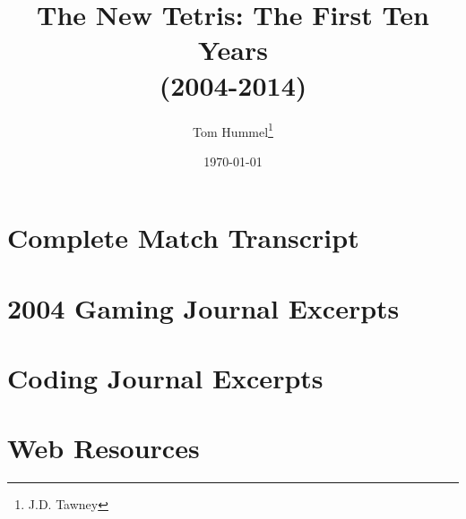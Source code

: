 \documentclass[a4paper,twoside,titlepage]{book}
\title{The New Tetris: The First Ten Years 
\\(2004-2014)}
\author{Tom Hummel\thanks{J.D. Tawney}}
\date{\today}
\begin{document}
  \maketitle
  \tableofcontents \newpage
  
  
  
  
  
  
  
  \begin{appendices}
    \chapter{Complete Match Transcript}
    \chapter{2004 Gaming Journal Excerpts}
    \chapter{Coding Journal Excerpts}
    \chapter{Web Resources}
  \end{appendices}
  \clearpage
  \printindex
\end{document}
